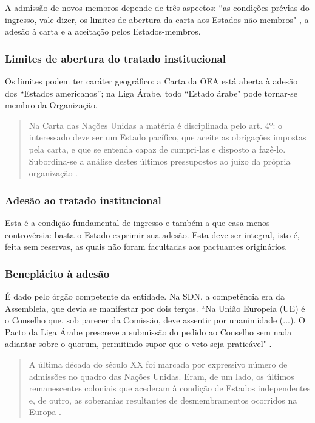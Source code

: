 \documentclass{article}
\begin{document}
A admissão de novos membros depende de três aspectos: ``as condições prévias do ingresso, vale dizer, os limites de abertura da carta aos Estados não membros" \cite[p. 115]{rezek_direito_2024}, a adesão à carta e a aceitação pelos Estados-membros.

\subsubsection{Limites de abertura do tratado institucional}

Os limites podem ter caráter geográfico: a Carta da OEA está aberta à adesão dos “Estados americanos”; na Liga Árabe, todo ``Estado árabe" pode tornar-se membro da Organização.

\begin{quote}
    Na Carta das Nações Unidas a matéria é disciplinada pelo art. 4º: o interessado deve ser um Estado pacífico, que aceite as obrigações impostas pela carta, e que se entenda capaz de cumpri-las e disposto a fazê-lo. Subordina-se a análise destes últimos pressupostos ao juízo da própria organização \cite[p. 116]{rezek_direito_2024}.
\end{quote}

\subsubsection{Adesão ao tratado institucional}

Esta é a condição fundamental de ingresso e também a que casa menos controvérsia: basta o Estado exprimir sua adesão. Esta deve ser integral, isto é, feita sem reservas, as quais não foram facultadas aos pactuantes originários.

\subsubsection{Beneplácito à adesão}

É dado pelo órgão competente da entidade. Na SDN, a competência era da Assembleia, que devia se manifestar por dois terços. ``Na União Europeia (UE) é o Conselho que, sob parecer da Comissão, deve assentir por unanimidade (...). O Pacto da Liga Árabe prescreve a submissão do pedido ao Conselho sem nada adiantar sobre o quorum, permitindo supor que o veto seja praticável" \cite[p. 116]{rezek_direito_2024}.

\begin{quote}
    A última década do século XX foi marcada por expressivo número de admissões no quadro das Nações Unidas. Eram, de um lado, os últimos remanescentes coloniais que acederam à condição de Estados independentes e, de outro, as soberanias resultantes de desmembramentos ocorridos na Europa \cite[p. 116]{rezek_direito_2024}.
\end{quote}

\printbibliography
\end{document}
